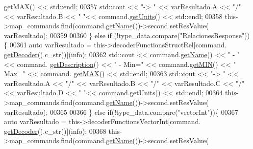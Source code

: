 \begin{DoxyCode}
{{{{{{{{{{      \hyperlink{classCommands_afbad1051313d0cdecba276384cb7fc6b}{getMAX}() << std::endl;
00357                                     std::cout << \textcolor{stringliteral}{"-> "} << varResultado.A << \textcolor{stringliteral}{"/"} << varResultado.B << \textcolor{stringliteral}{" "}<< 
      command.\hyperlink{classCommands_ac67214a4fbd93fbb4d8ebb2dd815a3fa}{getUnits}() << std::endl;
00358                                     this->map\_commands.find(command.\hyperlink{classCommands_adf3d8a96310b1f4e57a6ecf0f2f153ea}{getName}())->second.setResValue(
      varResultado);
00359 
00360                                 \} \textcolor{keywordflow}{else} \textcolor{keywordflow}{if} (!type\_data.compare(\textcolor{stringliteral}{"RelacionesResponse"})) \{
00361                                     \textcolor{keyword}{auto} varResultado = this->decoderFunctionsStructRel[command.
      \hyperlink{classCommands_a8b4c2a655d8dd3de334338d6684d469c}{getDecoder}().c\_str()](info);
00362                                     std::cout << command.\hyperlink{classCommands_adf3d8a96310b1f4e57a6ecf0f2f153ea}{getName}() << \textcolor{stringliteral}{" - "} << command.
      \hyperlink{classCommands_ad82fe7dfcf1908423bdb59d048020e26}{getDescription}() << \textcolor{stringliteral}{" - Min="} << command.\hyperlink{classCommands_af0a1e2ea65b5a57997c721a8d77a1013}{getMIN}() << \textcolor{stringliteral}{" Max="} << command.
      \hyperlink{classCommands_afbad1051313d0cdecba276384cb7fc6b}{getMAX}() << std::endl;
00363                                     std::cout << \textcolor{stringliteral}{"-> "} << varResultado.A << \textcolor{stringliteral}{"/"} << varResultado.B << \textcolor{stringliteral}{"/"} <<
       varResultado.C << \textcolor{stringliteral}{"/"} << varResultado.D << \textcolor{stringliteral}{" "}<< command.\hyperlink{classCommands_ac67214a4fbd93fbb4d8ebb2dd815a3fa}{getUnits}() << std::endl;
00364                                     this->map\_commands.find(command.\hyperlink{classCommands_adf3d8a96310b1f4e57a6ecf0f2f153ea}{getName}())->second.setResValue(
      varResultado);
00365 
00366                                 \} \textcolor{keywordflow}{else} \textcolor{keywordflow}{if}(!type\_data.compare(\textcolor{stringliteral}{"vectorInt"}))\{
00367                                     \textcolor{keyword}{auto} varResultado = this->decoderFunctionsVectorInt[command.
      \hyperlink{classCommands_a8b4c2a655d8dd3de334338d6684d469c}{getDecoder}().c\_str()](info);
00368                                     this->map\_commands.find(command.\hyperlink{classCommands_adf3d8a96310b1f4e57a6ecf0f2f153ea}{getName}())->second.setResValue(
}}}}}}}}}}
\end{DoxyCode}
